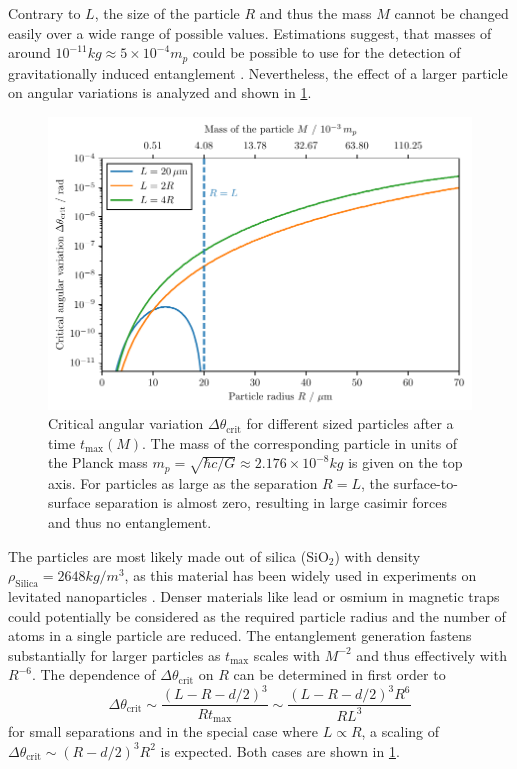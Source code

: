 Contrary to $L$, the size of the particle $R$ and thus the mass $M$ cannot be changed easily over a wide range of possible values.
Estimations suggest, that masses of around $10^{-11}\si{kg} \approx 5 \times 10^{-4}m_p$ could be possible to use for the detection of gravitationally induced entanglement \cite[Timestamp 51:00]{Aspelmeyer_2024}.
Nevertheless, the effect of a larger particle on angular variations is analyzed and shown in \cref{fig:4:theta-crit-mass}.
\begin{figure}[!htbp]
  \centering
  \includegraphics[width=\textwidth]{./../figures/theta-variance/theta-crit-mass.pdf}
  \caption{Critical angular variation $\Delta \theta_\mathrm{crit}$ for different sized particles after a time $t_\mathrm{max}(M)$. The mass of the corresponding particle in units of the Planck mass $m_p = \sqrt{\hbar c / G} \approx 2.176\times 10^{-8}\si{kg}$ is given on the top axis. For particles as large as the separation $R = L$, the surface-to-surface separation is almost zero, resulting in large casimir forces and thus no entanglement.}
  \label{fig:4:theta-crit-mass}
\end{figure}
The particles are most likely made out of silica ($\mathrm{SiO_2}$) with density $\rho_\mathrm{Silica} = 2648\si{kg/m^3}$, as this material has been widely used in experiments on levitated nanoparticles \cite{Grass_2016,Slezak_2018}.
Denser materials like lead or osmium \cite{Krisnanda_2020} in magnetic traps could potentially be considered as the required particle radius and the number of atoms in a single particle are reduced.
The entanglement generation fastens substantially for larger particles as $t_\mathrm{max}$ scales with $M^{-2}$ and thus effectively with $R^{-6}$.
The dependence of $\Delta \theta_\mathrm{crit}$ on $R$ can be determined in first order to
\begin{equation}
  \Delta \theta_\mathrm{crit} \sim \frac{(L - R - d/2)^3}{R t_\mathrm{max}} \sim \frac{(L - R - d/2)^3 R^6}{R L^3 }
\end{equation}
for small separations and in the special case where $L \propto R$, a scaling of $\Delta \theta_\mathrm{crit} \sim (R - d/2)^3 R^2$ is expected.
Both cases are shown in \cref{fig:4:theta-crit-mass}.

